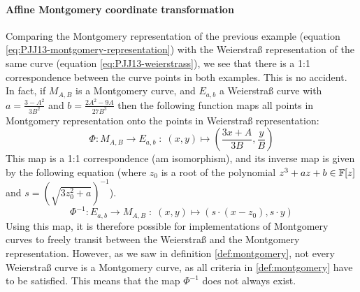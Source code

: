 \paragraph{Affine Montgomery coordinate transformation} Comparing the Montgomery representation of the previous example (equation \ref{eq:PJJ13-montgomery-representation}) with the Weierstraß representation of the same curve (equation \ref{eq:PJJ13-weierstrass}), we see that there is a 1:1 correspondence between the curve points in both examples. This is no accident. In fact, if $M_{A,B}$ is a Montgomery curve, and $E_{a,b}$ a Weierstraß curve with $a = \frac{3-A^2}{3B^2}$ and $b= \frac{2A^2 -9A}{27B^3}$ then the following function maps all points in Montgomery representation onto the points in Weierstraß representation:
\begin{equation}
\Phi: M_{A,B} \to E_{a,b}\; : \; (x,y) \mapsto \left(\frac{3x + A}{3B}, \frac{y}{B}\right)
\end{equation}
This map is a 1:1 correspondence (am isomorphism), and its inverse map is given by the following equation (where $z_0$ is a root of the polynomial $z^3 + a z + b \in \mathbb{F}[z]$ and $s=({\sqrt{3z_0^{2}+a}})^{-1}$).
\begin{equation}
\Phi^{-1}: E_{a,b} \to M_{A,B}\; : \; (x,y) \mapsto \left(s\cdot(x-z_0), s\cdot y\right)
\end{equation}
 Using this map, it is therefore possible for implementations of Montgomery curves to freely transit between the Weierstraß and the Montgomery representation. However, as we saw in definition \ref{def:montgomery}, not every Weierstraß curve is a Montgomery curve, as all criteria in \ref{def:montgomery} have to be satisfied. This means that the map $\Phi^{-1}$ does not always exist. 
 
